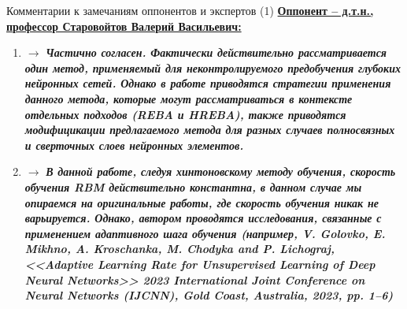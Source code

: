 \documentclass[10pt]{beamer}
\begin{document}
\begin{frame}{Комментарии к замечаниям оппонентов и экспертов (1)}
    \small
    \underline{\textbf{Оппонент -- д.т.н., профессор Старовойтов Валерий Васильевич:}}
    \begin{enumerate}
        \item {}
        
        $\rightarrow$ \textit{\textbf{Частично согласен. Фактически действительно рассматривается один метод, применяемый для неконтролируемого предобучения глубоких нейронных сетей. Однако в работе приводятся стратегии применения данного метода, которые могут рассматриваться в контексте отдельных подходов (REBA и HREBA), также приводятся модифицикации предлагаемого метода для разных случаев полносвязных и сверточных слоев нейронных элементов.}}
        \item {}   
        
        $\rightarrow$ \textit{\textbf{В данной работе, следуя хинтоновскому методу обучения, скорость обучения RBM действительно константна, в данном случае мы опираемся на оригинальные работы, где скорость обучения никак не варьируется. Однако, автором проводятся исследования, связанные с применением адаптивного шага обучения (например, V. Golovko, E. Mikhno, A. Kroschanka, M. Chodyka and P. Lichograj, <<Adaptive Learning Rate for Unsupervised Learning of Deep Neural Networks>> 2023 International Joint Conference on Neural Networks (IJCNN), Gold Coast, Australia, 2023, pp. 1--6)}}       
    \end{enumerate}
\end{frame}
\end{document}
